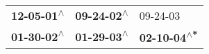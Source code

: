 \begin{supertabular}{lll}
 \textbf{12-05-01\textsuperscript{$\wedge$}} &  \textbf{09-24-02\textsuperscript{$\wedge$}} &                    09-24-03\textsuperscript{} \\
 \textbf{01-30-02\textsuperscript{$\wedge$}} &  \textbf{01-29-03\textsuperscript{$\wedge$}} &  \textbf{02-10-04\textsuperscript{$\wedge$*}} \\
\end{supertabular}
